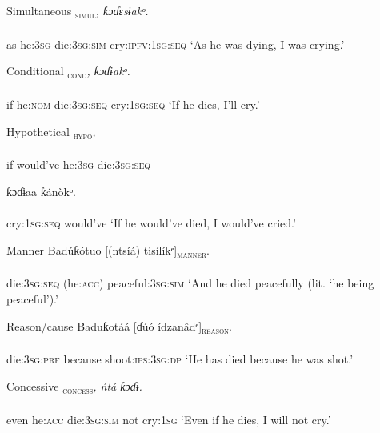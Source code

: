 Simultaneous
\ea\label{ex:}
\textsc{\textsubscript{simul}}\textit{,   ƙɔɗɛsɨakᵒ.} \\
    \\
as   he:\textsc{3sg}   die:\textsc{3sg:sim}    cry:\textsc{ipfv}:\textsc{1sg:seq}
\glt ‘As he was dying, I was crying.’ 
\z




Conditional
\ea\label{ex:}
\textsc{\textsubscript{cond}}\textit{,   ƙɔɗɨakᵒ.} \\
    \\
if   he:\textsc{nom}   die:\textsc{3sg:seq}     cry:\textsc{1sg:seq}
\glt ‘If he dies, I’ll cry.’ 
\z




Hypothetical
\ea\label{ex:}
\textsc{\textsubscript{hypo}}\textit{,}  \\
    \\
if   would’ve   he:\textsc{3sg}  die:\textsc{3sg:seq}   
\z

\ea\label{ex:}
\gll ƙɔɗɨaa   ƙánòkᵒ. \\
    \\
cry:\textsc{1sg:seq}  would’ve
\glt ‘If he would’ve died, I would’ve cried.’ 
\z




Manner
\ea\label{ex:}
\gll Badúƙótuo   [(ntsíá)   tisílíkᵉ]\textsc{\textsubscript{manner}}. \\
    \\
die:\textsc{3sg:seq}   (he:\textsc{acc})  peaceful:3\textsc{sg:sim}
\glt ‘And he died peacefully (lit. ‘he being peaceful’).’ 
\z




Reason/cause
\ea\label{ex:}
\gll Baduƙotáá   [ɗúó     ídzanâdᵉ]\textsc{\textsubscript{reason}}. \\
    \\
die:\textsc{3sg:prf}   because   shoot:\textsc{ips:3sg:dp}
\glt ‘He has died because he was shot.’ 
\z




Concessive
\ea\label{ex:}
\textsc{\textsubscript{concess}}\textit{,   ńtá   ƙɔɗɨ.} \\
    \\
even   he:\textsc{acc}   die:\textsc{3sg:sim}    not   cry:\textsc{1sg}
\glt ‘Even if he dies, I will not cry.’ 
\z






